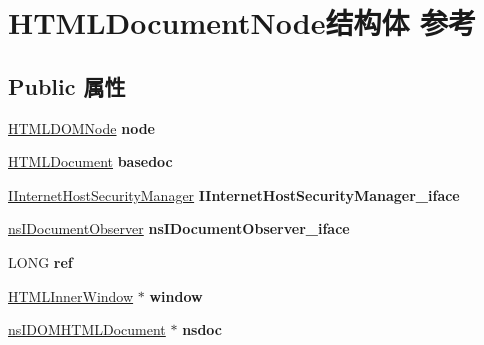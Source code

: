 \hypertarget{struct_h_t_m_l_document_node}{}\section{H\+T\+M\+L\+Document\+Node结构体 参考}
\label{struct_h_t_m_l_document_node}
\subsection*{Public 属性}
\begin{DoxyCompactItemize}
\item 
\mbox{\label{struct_h_t_m_l_document_node_a3d483dbe2cdab3fdcadd54b02034cddb}} 
\hyperlink{struct_h_t_m_l_d_o_m_node}{H\+T\+M\+L\+D\+O\+M\+Node} {\bfseries node}
\item 
\mbox{\label{struct_h_t_m_l_document_node_aa11b196d08989ea713ccf824143f0777}} 
\hyperlink{struct_h_t_m_l_document}{H\+T\+M\+L\+Document} {\bfseries basedoc}
\item 
\mbox{\label{struct_h_t_m_l_document_node_a5af4399a9f4a6bc15805b3f4a4510b7f}} 
\hyperlink{interface_i_internet_host_security_manager}{I\+Internet\+Host\+Security\+Manager} {\bfseries I\+Internet\+Host\+Security\+Manager\+\_\+iface}
\item 
\mbox{\label{struct_h_t_m_l_document_node_a4481989419b84fb9155e4eed05b9e5c4}} 
\hyperlink{interfacens_i_document_observer}{ns\+I\+Document\+Observer} {\bfseries ns\+I\+Document\+Observer\+\_\+iface}
\item 
\mbox{\label{struct_h_t_m_l_document_node_af7268ffcac4e3d57522bdcaaec274b41}} 
L\+O\+NG {\bfseries ref}
\item 
\mbox{\label{struct_h_t_m_l_document_node_aa1b73405ce992a811d41b1f32ff02f9e}} 
\hyperlink{struct_h_t_m_l_inner_window}{H\+T\+M\+L\+Inner\+Window} $\ast$ {\bfseries window}
\item 
\mbox{\label{struct_h_t_m_l_document_node_a5fdfe7705ebd49b6db146bf83f3d6d5a}} 
\hyperlink{interfacens_i_d_o_m_h_t_m_l_document}{ns\+I\+D\+O\+M\+H\+T\+M\+L\+Document} $\ast$ {\bfseries nsdoc}

\end{DoxyCompactItemize}

